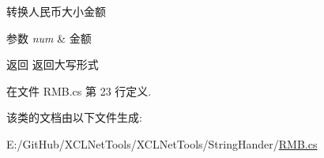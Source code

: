 转换人民币大小金额 


\begin{DoxyParams}{参数}
{\em num} & 金额\\
\hline
\end{DoxyParams}
\begin{DoxyReturn}{返回}
返回大写形式
\end{DoxyReturn}


在文件 R\+M\+B.\+cs 第 23 行定义.



该类的文档由以下文件生成\+:\begin{DoxyCompactItemize}
\item 
E\+:/\+Git\+Hub/\+X\+C\+L\+Net\+Tools/\+X\+C\+L\+Net\+Tools/\+String\+Hander/\hyperlink{_r_m_b_8cs}{R\+M\+B.\+cs}\end{DoxyCompactItemize}
